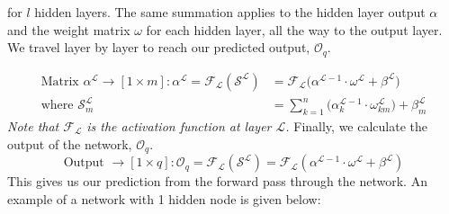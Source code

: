 \documentclass{report}
\begin{document}
for $l$ hidden layers.
\vspace{1em}
\newline
The same summation applies to the hidden layer output $\alpha$ and the weight matrix $\omega$ for each hidden layer, all the way to the output layer.
We travel layer by layer to reach our predicted output, $\mathcal{O}_{q}$.

\begin{align}
    \text{Matrix }\alpha^{\mathcal{L}}\rightarrow \left[1\times m\right] : \alpha^{\mathcal{L}}  = 
    \mathcal{F}_\mathcal{L}(\mathcal{S}^{\mathcal{L}}) &= \mathcal{F}_{\mathcal{L}}\Big(\alpha^{\mathcal{L}-1}\cdot\omega^{\mathcal{L}} + \beta^{\mathcal{L}}\Big)\\
    \text{where }\mathcal{S}^{\mathcal{L}}_{m} &= \sum_{k=1}^{n} \Big( \alpha_k^{\mathcal{L}-1}\cdot\omega^{\mathcal{L}}_{km} \Big) + \beta^{\mathcal{L}}_{m}
\end{align}
\textit{Note that $\mathcal{F}_\mathcal{L}$ is the activation function at layer $\mathcal{L}$.}
\newline
\vspace{1em}
Finally, we calculate the output of the network, $\mathcal{O}_{q}$.
\begin{equation}
    \text{Output }\rightarrow \left[1\times q\right] : \mathcal{O}_{q}  = 
    \mathcal{F}_\mathcal{L}(\mathcal{S}^{\mathcal{L}}) = \mathcal{F}_\mathcal{L}(\alpha^{\mathcal{L}-1}\cdot\omega^{\mathcal{L}} + \beta^{\mathcal{L}})
\end{equation}
This gives us our prediction from the forward pass through the network. 
\vspace{1em}
\newline
An example of a network with 1 hidden node is given below:
\vspace{1em}
\newline
\end{document}
